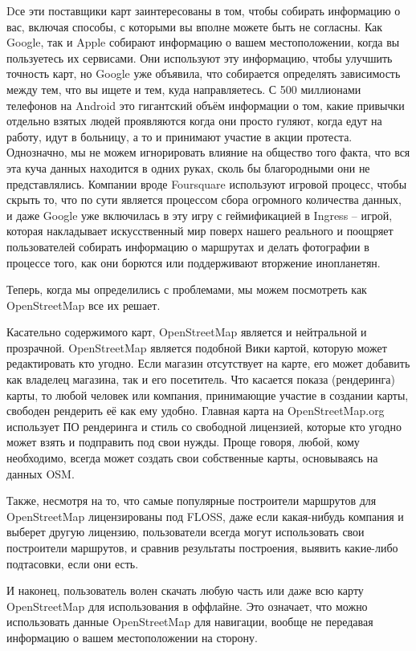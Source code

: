 Dсе эти поставщики карт заинтересованы в том, чтобы собирать информацию о вас, 
включая способы, с которыми вы вполне можете быть не согласны. Как Google, так 
и Apple собирают информацию о вашем местоположении, когда вы пользуетесь их 
сервисами. Они используют эту информацию, чтобы улучшить точность карт, но 
Google уже объявила, что собирается определять зависимость между тем, что вы 
ищете и тем, куда направляетесь. С 500 миллионами телефонов на Android это 
гигантский объём информации о том, какие привычки отдельно взятых людей 
проявляются когда они просто гуляют, когда едут на работу, идут в больницу, а 
то и принимают участие в акции протеста. Однозначно, мы не можем игнорировать 
влияние на общество того факта, что вся эта куча данных находится в одних 
руках, сколь бы благородными они не представлялись. Компании вроде 
Foursquare\cite{four4} используют игровой процесс, чтобы скрыть то, что по 
сути является процессом сбора огромного количества данных, и даже Google уже 
включилась в эту игру с геймификацией в Ingress\cite{ingress} -- игрой, 
которая накладывает искусственный мир поверх нашего реального и поощряет 
пользователей собирать информацию о маршрутах и делать фотографии в процессе 
того, как они борются или поддерживают вторжение инопланетян.

Теперь, когда мы определились с проблемами, мы можем посмотреть как 
OpenStreetMap все их решает.

Касательно содержимого карт, OpenStreetMap является и нейтральной и 
прозрачной. OpenStreetMap является подобной Вики картой, которую может 
редактировать кто угодно. Если магазин отсутствует на карте, его может 
добавить как владелец магазина, так и его посетитель. Что касается показа 
(рендеринга) карты, то любой человек или компания, принимающие участие в 
создании карты, свободен рендерить её как ему удобно. Главная карта на 
OpenStreetMap.org использует ПО рендеринга и стиль со свободной лицензией, 
которые кто угодно может взять и подправить под свои нужды. Проще говоря, 
любой, кому необходимо, всегда может создать свои собственные карты, 
основываясь на данных OSM.

Также, несмотря на то, что самые популярные построители маршрутов для 
OpenStreetMap лицензированы под FLOSS\cite{floss}, даже если какая-нибудь 
компания и выберет другую лицензию, пользователи всегда могут использовать 
свои построители маршрутов, и сравнив результаты построения, выявить 
какие-либо подтасовки, если они есть.

И наконец, пользователь волен скачать любую часть или даже всю карту 
OpenStreetMap для использования в оффлайне. Это означает, что можно 
использовать данные OpenStreetMap для навигации, вообще не передавая 
информацию о вашем местоположении на сторону.
\cite{habrahabr01}

